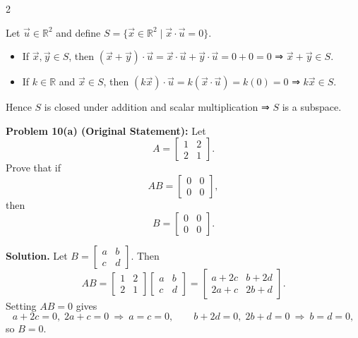 \documentclass[8pt]{extarticle}
\begin{document}
\begin{multicols}{2}
\begin{tcolorbox}[title=Proof – Orthogonal Set Is a Subspace]
Let \(\vec u\in\mathbb{R}^2\) and define \(S=\{\vec x\in\mathbb{R}^2\mid \vec x\cdot\vec u=0\}\).
\begin{itemize}
\item If \(\vec x,\vec y\in S\), then  
\((\vec x+\vec y)\cdot\vec u
= \vec x\cdot\vec u+\vec y\cdot\vec u=0+0=0\)
⇒ \(\vec x+\vec y\in S.\)
\item If \(k\in\mathbb{R}\) and \(\vec x\in S\), then  
\((k\vec x)\cdot\vec u
= k(\vec x\cdot\vec u)=k(0)=0\)
⇒ \(k\vec x\in S.\)
\end{itemize}
Hence \(S\) is closed under addition and scalar multiplication ⇒ \(S\) is a subspace.
\end{tcolorbox}


\begin{tcolorbox}[title=]
\noindent
\textbf{Problem 10(a) (Original Statement):}\quad
Let
\[
A=\begin{bmatrix}1&2\\[2pt]2&1\end{bmatrix}.
\]
Prove that if
\[
AB=\begin{bmatrix}0&0\\[2pt]0&0\end{bmatrix},
\]
then
\[
B=\begin{bmatrix}0&0\\[2pt]0&0\end{bmatrix}.
\]

\smallskip
\textbf{Solution.}
Let \(B=\begin{bmatrix}a&b\\ c&d\end{bmatrix}\).
Then
\[
AB=
\begin{bmatrix}1&2\\ 2&1\end{bmatrix}
\begin{bmatrix}a&b\\ c&d\end{bmatrix}
=
\begin{bmatrix}a+2c & b+2d\\[2pt] 2a+c & 2b+d\end{bmatrix}.
\]
Setting \(AB=0\) gives
\[
a+2c=0,\;2a+c=0 \ \Rightarrow\ a=c=0, \qquad
b+2d=0,\;2b+d=0 \ \Rightarrow\ b=d=0,
\]
so \(B=0\).


\end{tcolorbox}
\end{multicols}
\end{document}

